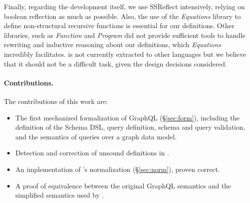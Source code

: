 
 Finally, regarding the development itself, we use SSReflect  intensively, relying on boolean reflection as much as possible. Also, the use of the \textit{Equations} library  to define non-structural recursive functions is essential for our definitions. Other libraries, such as \textit{Function} and \textit{Program} did not provide sufficient tools to handle rewriting and inductive reasoning about our definitions, which \textit{Equations} incredibly facilitates. \coql{} is not currently extracted to other languages but we believe that it should not be a difficult task, given the design decisions considered.


\paragraph{Contributions.}
The contributions of this work are:
\begin{itemize}
    \item The first mechanized formalization of GraphQL (\S\ref{sec:form}), including the definition of the Schema DSL, query definition, schema and query validation, and the semantics of queries over a graph data model.
    \item {} Detection and correction of unsound definitions in \HP{}.
    \item An implementation of \HP{}'s normalization (\S\ref{sec:norm}), proven correct.
    \item A proof of equivalence between the original GraphQL semantics and the simplified semantics used by \HP{}.
\end{itemize}

